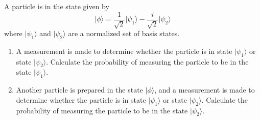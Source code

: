 \begin{problem}
A particle is in the state given by
\[ \vert\mbox{$\phi$}\rangle = \frac{1}{\sqrt{2}} \vert\mbox{$\psi_1$}\rangle - \frac{i}{\sqrt{2}} \vert\mbox{$\psi_2$}\rangle \]
where $\vert\mbox{$\psi_1$}\rangle$ and $\vert\mbox{$\psi_2$}\rangle$ are a normalized set of basis states.
\begin{enumerate}
\item A measurement is made to determine whether the particle is in state $\vert\mbox{$\psi_1$}\rangle$ or state $\vert\mbox{$\psi_2$}\rangle$. Calculate the probability of measuring the particle to be in the state $\vert\mbox{$\psi_1$}\rangle$.
\item Another particle is prepared in the state $\vert\mbox{$\phi$}\rangle$, and a measurement is made to determine whether the particle is in state $\vert\mbox{$\psi_1$}\rangle$ or state $\vert\mbox{$\psi_2$}\rangle$. Calculate the probability of measuring the particle to be in the state $\vert\mbox{$\psi_2$}\rangle$.
\end{enumerate}
\end{problem}

